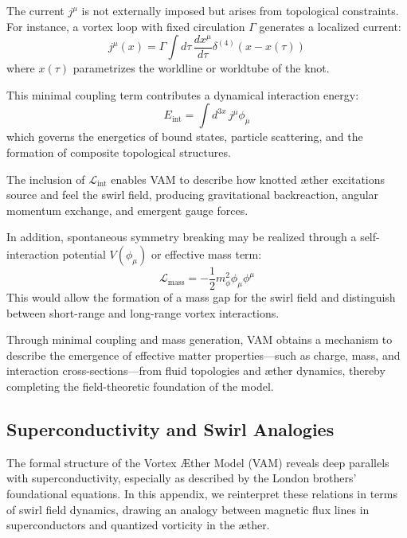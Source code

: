 \documentclass[a4paper,12pt]{article}
\begin{document}
        The current $j^\mu$ is not externally imposed but arises from topological constraints. For instance, a vortex loop with fixed circulation $\Gamma$ generates a localized current:
        \begin{equation}
            j^\mu(x) = \Gamma \int d\tau \, \frac{dx^\mu}{d\tau} \delta^{(4)}(x - x(\tau))
        \end{equation}
        where $x(\tau)$ parametrizes the worldline or worldtube of the knot.

        This minimal coupling term contributes a dynamical interaction energy:
        \begin{equation}
            E_{\text{int}} = \int d^{3x} \, j^\mu \phi_\mu
        \end{equation}
        which governs the energetics of bound states, particle scattering, and the formation of composite topological structures.

        The inclusion of $\mathcal{L}_{\text{int}}$ enables VAM to describe how knotted æther excitations source and feel the swirl field, producing gravitational backreaction, angular momentum exchange, and emergent gauge forces.

        In addition, spontaneous symmetry breaking may be realized through a self-interaction potential $V(\phi_\mu)$ or effective mass term:
        \begin{equation}
            \mathcal{L}_{\text{mass}} = -\frac{1}{2} m_\phi^2 \phi_\mu \phi^\mu
        \end{equation}
        This would allow the formation of a mass gap for the swirl field and distinguish between short-range and long-range vortex interactions.

        Through minimal coupling and mass generation, VAM obtains a mechanism to describe the emergence of effective matter properties---such as charge, mass, and interaction cross-sections---from fluid topologies and æther dynamics, thereby completing the field-theoretic foundation of the model.

        \subsection{Superconductivity and Swirl Analogies}
        The formal structure of the Vortex Æther Model (VAM) reveals deep parallels with superconductivity, especially as described by the London brothers' foundational equations. In this appendix, we reinterpret these relations in terms of swirl field dynamics, drawing an analogy between magnetic flux lines in superconductors and quantized vorticity in the æther.
\end{document}
